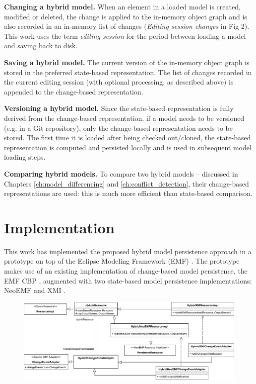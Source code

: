 \textbf{Changing a hybrid model.} When an element in a loaded model is created, modified or deleted, the change is applied to the in-memory object graph and is also recorded in an in-memory list of changes (\textit{Editing session changes} in Fig 2). This work uses the term \emph{editing session} for the period between loading a model and saving back to disk. 

\textbf{Saving a hybrid model.} The current version of the in-memory object graph is stored in the preferred state-based representation. The list of changes recorded in the current editing session (with optional processing, as described above) is appended to the change-based representation.

\textbf{Versioning a hybrid model.} Since the state-based representation is fully derived from the change-based representation, if a model needs to be versioned (e.g. in a Git repository), only the change-based representation needs to be stored. The first time it is loaded after being checked out/cloned, the state-based representation is computed and persisted locally and is used in subsequent model loading steps.

\textbf{Comparing hybrid models.} To compare two hybrid models -- discussed in Chapters \ref{ch:model_differencing} and \ref{ch:conflict_detection}, their change-based representations are used: this is much more efficient than state-based comparison. 

\section{Implementation}
\label{sec:implementation}
This work has implemented the proposed hybrid model persistence approach in a prototype \cite{epsilonlabs2019emfcbp} on top of the Eclipse Modeling Framework (EMF) \cite{steinberg2008emf}. The prototype makes use of an existing implementation of change-based model persistence, the EMF CBP \cite{DBLP:conf/models/YohannisKP17}, augmented with two state-based model persistence implementations: NeoEMF \cite{daniel2016neoemf} and XMI \cite{omg2018xmi}.

\begin{landscape}
\begin{figure}[]
  \includegraphics[width=\linewidth]{images/class_diagram}
  \label{fig:class_diagram}
\end{figure}
\end{landscape}


